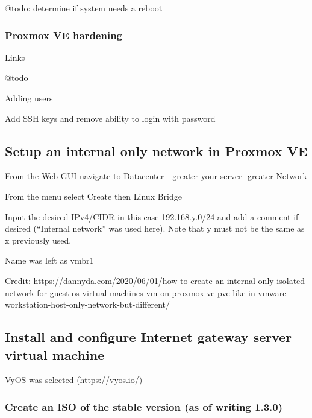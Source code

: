 @todo: determine if system needs a reboot

\hypertarget{proxmox-ve-hardening}{%
\subsubsection{Proxmox VE hardening}\label{proxmox-ve-hardening}}

Links

@todo

Adding users

Add SSH keys and remove ability to login with password

\hypertarget{setup-an-internal-only-network-in-proxmox-ve}{%
\subsection{Setup an internal only network in Proxmox
VE}\label{setup-an-internal-only-network-in-proxmox-ve}}

From the Web GUI navigate to Datacenter - greater{} your server
-greater{} Network

From the menu select Create then Linux Bridge

Input the desired IPv4/CIDR in this case 192.168.y.0/24 and add a
comment if desired (``Internal network'' was used here). Note that y
must not be the same as x previously used.

Name was left as vmbr1

Credit:
https://dannyda.com/2020/06/01/how-to-create-an-internal-only-isolated-network-for-guest-os-virtual-machines-vm-on-proxmox-ve-pve-like-in-vmware-workstation-host-only-network-but-different/

\hypertarget{install-and-configure-internet-gateway-server-virtual-machine}{%
\subsection{Install and configure Internet gateway server virtual
machine}\label{install-and-configure-internet-gateway-server-virtual-machine}}

VyOS was selected (https://vyos.io/)

\hypertarget{create-an-iso-of-the-stable-version-as-of-writing-1.3.0}{%
\subsubsection{Create an ISO of the stable version (as of writing
1.3.0)}\label{create-an-iso-of-the-stable-version-as-of-writing-1.3.0}}

